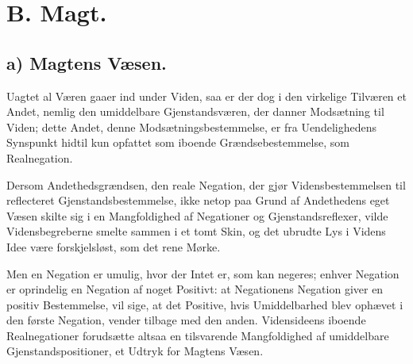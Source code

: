 \documentclass[12pt]{book}
\newcommand{\opage}[1]{\marginnote{\footnotesize\textit{[#1]}}}
\begin{document}
\chapter*{B. Magt.}
\opage{23} %

\section*{a) Magtens Væsen.}

Uagtet al Væren gaaer ind under Viden, saa er der dog i
den virkelige Tilværen et Andet, nemlig den umiddelbare
Gjenstandsværen, der danner Modsætning til Viden; dette
Andet, denne Modsætningsbestemmelse, er fra Uendelighedens
Synspunkt hidtil kun opfattet som iboende Grændsebestemmelse,
som Realnegation.

Dersom Andethedsgrændsen, den reale Negation, der
gjør Vidensbestemmelsen til reflecteret Gjenstandsbestemmelse,
ikke netop paa Grund af Andethedens eget Væsen skilte sig
i en Mangfoldighed af Negationer og Gjenstandsreflexer,
vilde Vidensbegreberne smelte sammen i et tomt Skin, og
det ubrudte Lys i Videns Idee være forskjelsløst, som det
rene Mørke.

Men en Negation er umulig, hvor der Intet er, som
kan negeres; enhver Negation er oprindelig en Negation af
noget Positivt: at Negationens Negation giver en positiv
Bestemmelse, vil sige, at det Positive, hvis Umiddelbarhed
blev ophævet i den første Negation, vender tilbage med den
anden. Vidensideens iboende Realnegationer forudsætte
altsaa en tilsvarende Mangfoldighed af umiddelbare
Gjenstandspositioner, et Udtryk for Magtens Væsen.

\opage{24} %
\end{document}

